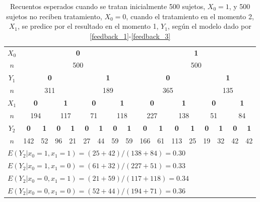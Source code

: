 \documentclass[spanish]{article}
\numberwithin{figure}{subsection}
\numberwithin{equation}{subsection}
\numberwithin{table}{subsection}
\begin{document}
\begin{table}[H]
	\label{feedback_table}
	\caption{Recuentos esperados cuando se tratan inicialmente 500 sujetos,
	$X_0 = 1$, y 500 sujetos no reciben tratamiento, $X_0 = 0$, cuando el
	tratamiento en el momento 2, $X_1$, se predice por el resultado en el
	momento 1, $Y_1$, según el modelo dado por
	\ref{feedback_1}-\ref{feedback_3}}
	\begin{tabular}{*{17}{c}}
		\hline
		$X_0$ & \multicolumn{8}{c}{\bf{0}} & \multicolumn{8}{c}{\bf{1}} \\[-3mm]

		$n$ & \multicolumn{8}{c}{500} & \multicolumn{8}{c}{500} \\

		$Y_1$ & \multicolumn{4}{c}{\bf{0}} & \multicolumn{4}{c}{\bf{1}} &
		\multicolumn{4}{c}{\bf{0}} & \multicolumn{4}{c}{\bf{1}} \\[-3mm]

		$n$ & \multicolumn{4}{c}{311} & \multicolumn{4}{c}{189} &
		\multicolumn{4}{c}{365} & \multicolumn{4}{c}{135} \\

		$X_1$ & \multicolumn{2}{c}{\bf{0}} & \multicolumn{2}{c}{\bf{1}} &
		\multicolumn{2}{c}{\bf{0}} & \multicolumn{2}{c}{\bf{1}} &
		\multicolumn{2}{c}{\bf{0}} & \multicolumn{2}{c}{\bf{1}} &
		\multicolumn{2}{c}{\bf{0}} & \multicolumn{2}{c}{\bf{1}} \\[-3mm]

		$n$ & \multicolumn{2}{c}{194} & \multicolumn{2}{c}{117} &
		\multicolumn{2}{c}{71} & \multicolumn{2}{c}{118} &
		\multicolumn{2}{c}{227} & \multicolumn{2}{c}{138} &
		\multicolumn{2}{c}{51} & \multicolumn{2}{c}{84} \\

		$Y_2$ & \bf{0} & \bf{1} & \bf{0} & \bf{1} & \bf{0} & \bf{1} & \bf{0} &
		\bf{1} & \bf{0} & \bf{1} & \bf{0} & \bf{1} &
		\bf{0} & \bf{1} & \bf{0} & \bf{1} \\[-3mm]

		$n$ & 142 & 52 & 96 & 21 & 27 & 44 & 59 & 59 & 166 & 61 & 113 & 25 &
		19 & 32 & 42 & 42 \\

		\multicolumn{17}{l}{$ E(Y_2|x_0 = 1, x_1 = 1) =
		(25 + 42) / (138 + 84) = 0.30 $} \\

		\multicolumn{17}{l}{$ E(Y_2|x_0 = 1, x_1 = 0) =
		(61 + 32) / (227 + 51) = 0.33 $} \\

		\multicolumn{17}{l}{$ E(Y_2|x_0 = 0, x_1 = 1) =
		(21 + 59) / (117 + 118) = 0.34 $} \\

		\multicolumn{17}{l}{$ E(Y_2|x_0 = 0, x_1 = 0) =
		(52 + 44) / (194 + 71) = 0.36 $} \\
		
		\hline
	\end{tabular}
\end{table}
\end{document}
